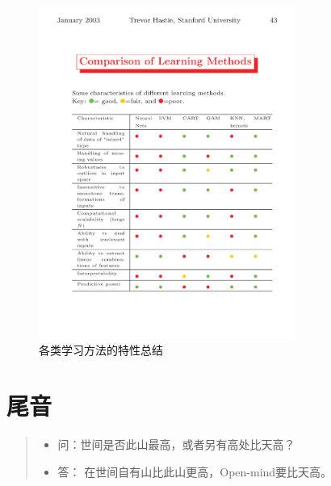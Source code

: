 \documentclass{cosart-xetex}
\begin{document}
\begin{figure}[htbp]
\centering
\includegraphics[width=0.75\textwidth]{compare.pdf}
\caption{各类学习方法的特性总结} \label{fig2}
\end{figure}

\section*{尾音}
\begin{quote}
\begin{itemize}

\item 问：世间是否此山最高，或者另有高处比天高？

\item 答： 在世间自有山比此山更高，Open-mind要比天高。
\end{itemize}
\end{quote}
\end{document}
